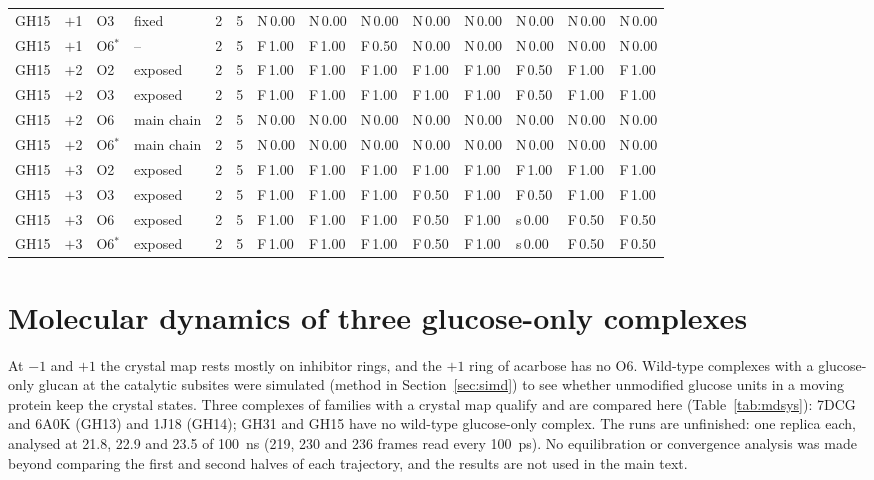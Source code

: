 \documentclass[preprint,12pt]{elsarticle}
\begin{document}
{\begin{longtable}{llllrrllllllll}
GH15 & $+$1 & O3 & fixed & 2 & 5 & N\,0.00 & N\,0.00 & N\,0.00 & N\,0.00 & N\,0.00 & N\,0.00 & N\,0.00 & N\,0.00\\
GH15 & $+$1 & O6$^\ast$ & -- & 2 & 5 & F\,1.00 & F\,1.00 & F\,0.50 & N\,0.00 & N\,0.00 & N\,0.00 & N\,0.00 & N\,0.00\\
GH15 & $+$2 & O2 & exposed & 2 & 5 & F\,1.00 & F\,1.00 & F\,1.00 & F\,1.00 & F\,1.00 & F\,0.50 & F\,1.00 & F\,1.00\\
GH15 & $+$2 & O3 & exposed & 2 & 5 & F\,1.00 & F\,1.00 & F\,1.00 & F\,1.00 & F\,1.00 & F\,0.50 & F\,1.00 & F\,1.00\\
GH15 & $+$2 & O6 & main chain & 2 & 5 & N\,0.00 & N\,0.00 & N\,0.00 & N\,0.00 & N\,0.00 & N\,0.00 & N\,0.00 & N\,0.00\\
GH15 & $+$2 & O6$^\ast$ & main chain & 2 & 5 & N\,0.00 & N\,0.00 & N\,0.00 & N\,0.00 & N\,0.00 & N\,0.00 & N\,0.00 & N\,0.00\\
GH15 & $+$3 & O2 & exposed & 2 & 5 & F\,1.00 & F\,1.00 & F\,1.00 & F\,1.00 & F\,1.00 & F\,1.00 & F\,1.00 & F\,1.00\\
GH15 & $+$3 & O3 & exposed & 2 & 5 & F\,1.00 & F\,1.00 & F\,1.00 & F\,0.50 & F\,1.00 & F\,0.50 & F\,1.00 & F\,1.00\\
GH15 & $+$3 & O6 & exposed & 2 & 5 & F\,1.00 & F\,1.00 & F\,1.00 & F\,0.50 & F\,1.00 & s\,0.00 & F\,0.50 & F\,0.50\\
GH15 & $+$3 & O6$^\ast$ & exposed & 2 & 5 & F\,1.00 & F\,1.00 & F\,1.00 & F\,0.50 & F\,1.00 & s\,0.00 & F\,0.50 & F\,0.50\\
\end{longtable}}

\section{Molecular dynamics of three glucose-only complexes}\label{sec:md}
At $-1$ and $+1$ the crystal map rests mostly on inhibitor rings, and the $+1$ ring of acarbose has no O6. Wild-type
complexes with a glucose-only glucan at the catalytic subsites were simulated (method in Section~\ref{sec:simd}) to see
whether unmodified glucose units in a moving protein keep the crystal states. Three complexes of families with a
crystal map qualify and are compared here (Table~\ref{tab:mdsys}): 7DCG and 6A0K (GH13) and 1J18 (GH14); GH31 and
GH15 have no wild-type glucose-only complex. The runs are unfinished: one replica each, analysed at 21.8, 22.9 and
23.5 of 100~ns (219, 230 and 236 frames read every 100~ps). No equilibration or convergence analysis was made beyond
comparing the first and second halves of each trajectory, and the results are not used in the main text.
\end{document}
